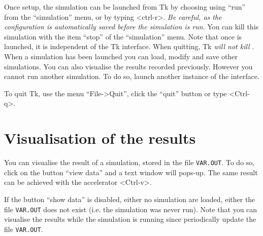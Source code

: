 Once setup, the simulation can be launched from Tk\stochsim{} by choosing using
``run'' from the ``simulation'' menu, or by typing \mbox{<ctrl-r>}. \emph{Be
  careful, as the configuration is automatically saved before the simulation is
  run}. You can kill this simulation with the item ``stop'' of the ``simulation'' menu.
Note that once \stochsim{} is launched, it is independent of the Tk interface.
When quitting, Tk\stochsim{} \emph{will not kill} \stochsim{}.  When a
simulation has been launched you can load, modify and save other simulations.
You can also visualise the results recorded previously. However you cannot
run another simulation. To do so, launch another instance of the interface.

To quit Tk\stochsim{}, use the menu ``File->Quit'', click the ``quit'' button or
type \mbox{<Ctrl-q>}.

\newpage

\section{Visualisation of the results}\label{display}

You can visualise the result of a simulation, stored in the file
\texttt{VAR.OUT}. To do so, click on the button ``view data'' and a text window
will pops-up. The same result can be achieved with the accelerator <Ctrl-v>.


If the button ``show data'' is disabled, either no simulation are loaded, either
the file \texttt{VAR.OUT} does not exist (i.e. the simulation was never run).
Note that you can visualise the results while the simulation is running since
\stochsim{} periodically update the file \texttt{VAR.OUT}.

